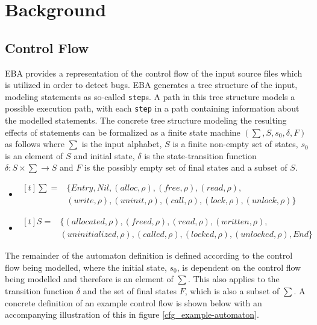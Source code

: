\section{Background}


\subsection{Control Flow}

EBA provides a representation of the control flow of the input source files which is utilized in order to detect bugs. EBA generates a tree structure of the input, modeling statements as so-called \texttt{step}s. A path in this tree structure models a possible execution path, with each \texttt{step} in a path containing information about the modelled statements. The concrete tree structure modeling the resulting effects of statements can be formalized as a finite state machine $(\sum, S, s_0, \delta, F)$ as follows where $\sum$ is the input alphabet, $S$ is a finite non-empty set of states, $s_0$ is an element of $S$ and initial state, $\delta$ is the state-transition function $\delta: S \times \sum \rightarrow S$ and $F$ is the possibly empty set of final states and a subset of $S$. 

\begin{itemize}
    \item{
        $
            \begin{aligned}[t] 
                \sum = & \{\mathit{Entry}, \mathit{Nil}, (alloc, \rho), (free, \rho), (read, \rho), \\ & (write, \rho), (uninit, \rho), (call, \rho), (lock, \rho), (unlock, \rho)\}
            \end{aligned} 
        $
    }
    \item{
        $
            \begin{aligned}[t]
                S = & \{(allocated, \rho), (freed, \rho), (read, \rho), (written, \rho),\\ & (uninitialized, \rho), (called, \rho), (locked, \rho), (unlocked, \rho), End\}
            \end{aligned}
        $
    }
\end{itemize}

\noindent The remainder of the automaton definition is defined according to the control flow being modelled, where the initial state, $s_0$, is dependent on the control flow being modelled and therefore is an element of $\sum$. This also applies to the transition function $\delta$ and the set of final states $F$, which is also a subset of $\sum$. A concrete definition of an example control flow is shown below with an accompanying illustration of this in figure \ref{cfg_example-automaton}.

